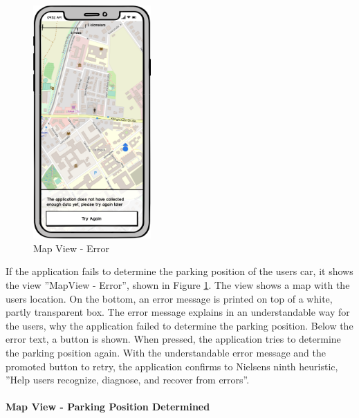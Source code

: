 \begin{figure}[h]
    \centering
    \includegraphics[width=0.4\textwidth]{images/UI/Iteration4-MapView-Error.png}
    \caption{Map View - Error}
    \label{fig:mv-error}
\end{figure}

If the application fails to determine the parking position of the users car, it shows the view ''MapView - Error'', shown in Figure \ref{fig:mv-error}. The view shows a map with the users location. On the bottom, an error message is printed on top of a white, partly transparent box. The error message explains in an understandable way for the users, why the application failed to determine the parking position. Below the error text, a button is shown. When pressed, the application tries to determine the parking position again. With the understandable error message and the promoted button to retry, the application confirms to Nielsens ninth heuristic, ''Help users recognize, diagnose, and recover from errors''. \cite{nielsen1994usability}

\paragraph{Map View - Parking Position Determined}

